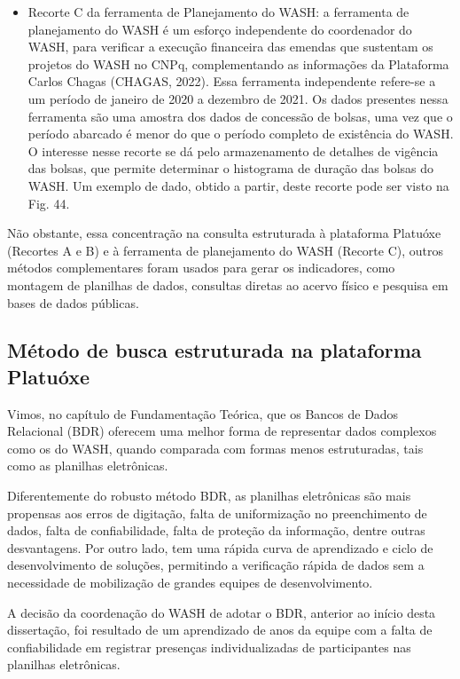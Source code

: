 \begin{itemize}
\item Recorte C da ferramenta de Planejamento do WASH: a ferramenta de planejamento do WASH é um esforço independente do coordenador do WASH, para verificar a execução financeira das emendas que sustentam os projetos do WASH no CNPq, complementando as informações da Plataforma Carlos Chagas  (CHAGAS, 2022). Essa ferramenta independente refere-se a um período de janeiro de 2020 a dezembro de 2021. Os dados presentes nessa ferramenta são uma amostra dos dados de concessão de bolsas, uma vez que o período abarcado é menor do que o período completo de existência do WASH. O interesse nesse recorte se dá pelo armazenamento de detalhes de vigência das bolsas, que permite determinar o histograma de duração das bolsas do WASH. Um exemplo de dado, obtido a partir, deste recorte pode ser visto na Fig. 44.
\end{itemize}

Não obstante, essa concentração na consulta estruturada à plataforma Platuóxe (Recortes A e B) e à ferramenta de planejamento do WASH (Recorte C), outros métodos complementares foram usados para gerar os indicadores, como montagem de planilhas de dados, consultas diretas ao acervo físico e pesquisa em bases de dados públicas.

\subsection[Método de busca estruturada na plataforma Platuóxe]{Método de busca estruturada na plataforma Platuóxe}\label{Método de busca estruturada na plataforma Platuóxe}
Vimos, no capítulo de Fundamentação Teórica, que os Bancos de Dados Relacional (BDR) oferecem uma melhor forma de representar dados complexos como os do WASH, quando comparada com formas menos estruturadas, tais como as planilhas eletrônicas.

Diferentemente do robusto método BDR, as planilhas eletrônicas são mais propensas aos erros de digitação, falta de uniformização no preenchimento de dados, falta de confiabilidade, falta de proteção da informação, dentre outras desvantagens. Por outro lado, tem uma rápida curva de aprendizado e ciclo de desenvolvimento de soluções, permitindo a verificação rápida de dados sem a necessidade de mobilização de grandes equipes de desenvolvimento.

A decisão da coordenação do WASH de adotar o BDR, anterior ao início desta dissertação, foi resultado de um aprendizado de anos da equipe com a falta de confiabilidade em registrar presenças individualizadas de participantes nas planilhas eletrônicas.

